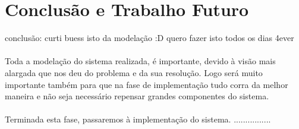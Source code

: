 \chapter{Conclusão e Trabalho Futuro}\label{chap con} 

conclusão: curti buess  isto da modelação :D quero fazer isto todos os dias 4ever\\
\\
Toda a modelação do sistema realizada, é importante, devido à visão mais alargada que nos deu do problema e da sua resolução.
Logo será muito importante também para que na fase de implementação tudo corra da melhor maneira e não seja necessário repensar grandes componentes
do sistema.\\ 
\\
Terminada esta fase, passaremos à implementação do sistema. ................